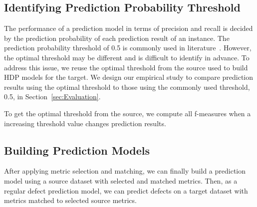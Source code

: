 
\subsection{Identifying Prediction Probability Threshold}
The performance of a prediction model in terms of precision and recall is decided by the prediction probability of each prediction result of an instance. The prediction probability threshold of 0.5 is commonly used in literature~. However, the optimal threshold may be different and is difficult to identify in advance. To address this issue, we reuse the optimal threshold from the source used to build HDP models for the target. We design our empirical study to compare prediction results using the optimal threshold to those using the commonly used threshold, 0.5, in Section~\ref{sec:Evaluation}.

To get the optimal threshold from the source, we compute all f-measures when a increasing threshold value changes prediction results.

\subsection{Building Prediction Models}

After applying metric selection and matching, we can finally build a
prediction model using a source dataset with selected and matched metrics. Then,
as a regular defect prediction model, we can predict defects on a target dataset
with metrics matched to selected source metrics.

